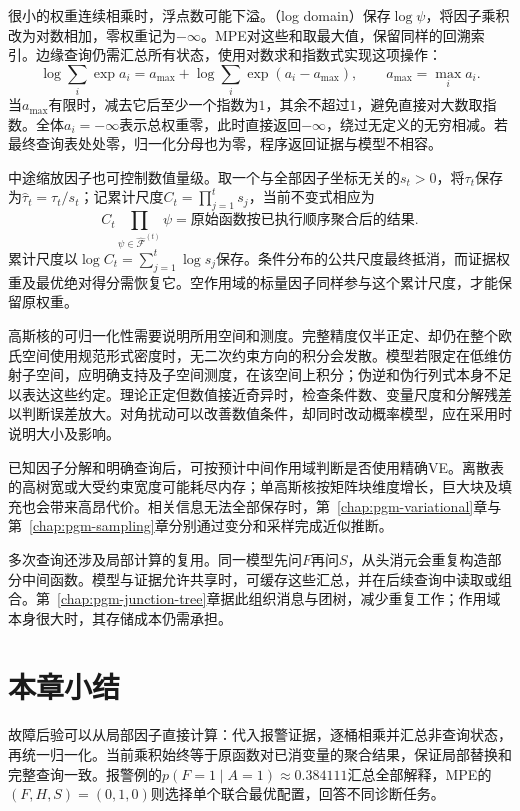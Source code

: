 很小的权重连续相乘时，浮点数可能下溢。（log domain）保存$\log\psi$，将因子乘积改为对数相加，零权重记为$-\infty$。MPE对这些和取最大值，保留同样的回溯索引。边缘查询仍需汇总所有状态，使用对数求和指数式实现这项操作：
\begin{equation}
  \log\sum_i\exp a_i
  =a_{\max}+\log\sum_i\exp(a_i-a_{\max}),
  \qquad a_{\max}=\max_i a_i.
  \label{eq:pgm-elimination-logsumexp}
\end{equation}
当$a_{\max}$有限时，减去它后至少一个指数为$1$，其余不超过$1$，避免直接对大数取指数。全体$a_i=-\infty$表示总权重零，此时直接返回$-\infty$，绕过无定义的无穷相减。若最终查询表处处零，归一化分母也为零，程序返回证据与模型不相容。

中途缩放因子也可控制数值量级。取一个与全部因子坐标无关的$s_t>0$，将$\tau_t$保存为$\widehat{\tau}_t=\tau_t/s_t$；记累计尺度$C_t=\prod_{j=1}^t s_j$，当前不变式相应为
\[
  C_t\prod_{\psi\in\widehat{\mathcal{F}}^{(t)}}\psi
  =\text{原始函数按已执行顺序聚合后的结果}.
\]
累计尺度以$\log C_t=\sum_{j=1}^t\log s_j$保存。条件分布的公共尺度最终抵消，而证据权重及最优绝对得分需恢复它。空作用域的标量因子同样参与这个累计尺度，才能保留原权重。

高斯核的可归一化性需要说明所用空间和测度。完整精度仅半正定、却仍在整个欧氏空间使用规范形式密度时，无二次约束方向的积分会发散。模型若限定在低维仿射子空间，应明确支持及子空间测度，在该空间上积分；伪逆和伪行列式本身不足以表达这些约定。理论正定但数值接近奇异时，检查条件数、变量尺度和分解残差以判断误差放大。对角扰动可以改善数值条件，却同时改动概率模型，应在采用时说明大小及影响。

已知因子分解和明确查询后，可按预计中间作用域判断是否使用精确VE。离散表的高树宽或大受约束宽度可能耗尽内存；单高斯核按矩阵块维度增长，巨大块及填充也会带来高昂代价。相关信息无法全部保存时，第~\ref{chap:pgm-variational}章与第~\ref{chap:pgm-sampling}章分别通过变分和采样完成近似推断。

多次查询还涉及局部计算的复用。同一模型先问$F$再问$S$，从头消元会重复构造部分中间函数。模型与证据允许共享时，可缓存这些汇总，并在后续查询中读取或组合。第~\ref{chap:pgm-junction-tree}章据此组织消息与团树，减少重复工作；作用域本身很大时，其存储成本仍需承担。

\section{本章小结}
\label{sec:pgm-elimination-summary}

故障后验可以从局部因子直接计算：代入报警证据，逐桶相乘并汇总非查询状态，再统一归一化。当前乘积始终等于原函数对已消变量的聚合结果，保证局部替换和完整查询一致。报警例的$p(F=1\mid A=1)\approx0.384111$汇总全部解释，MPE的$(F,H,S)=(0,1,0)$则选择单个联合最优配置，回答不同诊断任务。

